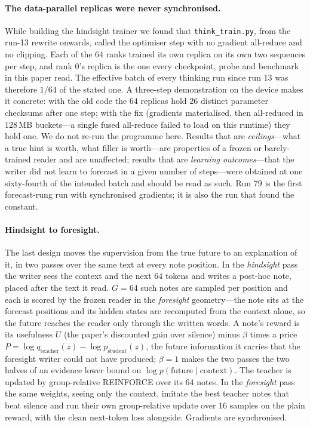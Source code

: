 \documentclass{article} %
\begin{document}
\paragraph{The data-parallel replicas were never synchronised.} While building the hindsight trainer we
found that \texttt{think\_train.py}, from the run-13 rewrite onwards, called the optimiser step with no
gradient all-reduce and no clipping. Each of the $64$ ranks trained its own replica on its own two sequences
per step, and rank 0's replica is the one every checkpoint, probe and benchmark in this paper read. The
effective batch of every thinking run since run 13 was therefore $1/64$ of the stated one. A three-step
demonstration on the device makes it concrete: with the old code the $64$ replicas hold $26$ distinct
parameter checksums after one step; with the fix (gradients materialised, then all-reduced in $128$\,MB
buckets---a single fused all-reduce failed to load on this runtime) they hold one. We do not re-run the
programme here. Results that are \emph{ceilings}---what a true hint is worth, what filler is worth---are
properties of a frozen or barely-trained reader and are unaffected; results that are \emph{learning
outcomes}---that the writer did not learn to forecast in a given number of steps---were obtained at
one sixty-fourth of the intended batch and should be read as such. Run 79 is the first forecast-rung run
with synchronised gradients; it is also the run that found the constant.

\paragraph{Hindsight to foresight.} The last design moves the supervision from the true future to an
explanation of it, in two passes over the same text at every note position. In the \emph{hindsight} pass
the writer sees the context and the next $64$ tokens and writes a post-hoc note, placed after the text it
read. $G = 64$ such notes are sampled per position and each is scored by the frozen reader in the
\emph{foresight} geometry---the note sits at the forecast positions and its hidden states are recomputed
from the context alone, so the future reaches the reader only through the written words. A note's reward is
its usefulness $U$ (the paper's discounted gain over silence) minus $\beta$ times a price
$P = \log q_{\text{teacher}}(z) - \log p_{\text{student}}(z)$, the future information it carries that the
foresight writer could not have produced; $\beta = 1$ makes the two passes the two halves of an evidence
lower bound on $\log p(\text{future} \mid \text{context})$. The teacher is updated by group-relative
REINFORCE over its $64$ notes. In the \emph{foresight} pass the same weights, seeing only the context,
imitate the best teacher notes that beat silence and run their own group-relative update over $16$ samples
on the plain reward, with the clean next-token loss alongside. Gradients are synchronised.
\end{document}

